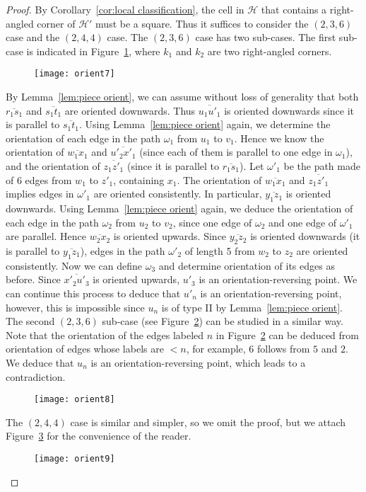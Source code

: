 \documentclass[11pt]{amsart}
\newcommand {\h}{\mathcal H}
\theoremstyle{definition}
\begin{document}
\begin{proof}
By Corollary~\ref{cor:local classification}, the cell in $\h$ that contains a right-angled corner of $\h'$ must be a square. Thus it suffices to consider the $(2,3,6)$ case and the $(2,4,4)$ case. The $(2,3,6)$ case has two sub-cases. The first sub-case is indicated in Figure~\ref{f:orient7}, where $k_1$ and $k_2$ are two right-angled corners.
\begin{figure}[h!]
	\centering
	\texttt{[image: orient7]}
	\caption{}
	\label{f:orient7}
\end{figure}
By Lemma~\ref{lem:piece orient}, we can assume without loss of generality that both $\overline{r_1s_1}$ and $\overline{s_1t_1}$ are oriented downwards. Thus $\overline{u_1u'_1}$ is oriented downwards since it is parallel to $\overline{s_1t_1}$. Using Lemma~\ref{lem:piece orient} again, we determine the orientation of each edge in the path $\omega_1$ from $u_1$ to $v_1$. Hence we know the orientation of $\overline{w_1x_1}$ and $\overline{u'_2x'_1}$ (since each of them is parallel to one edge in $\omega_1$), and the orientation of $\overline{z_1z'_1}$ (since it is parallel to $\overline{r_1s_1}$). Let $\omega'_1$ be the path made of 6 edges from $w_1$ to $z'_1$, containing $x_1$. The orientation of $\overline{w_1x_1}$ and $\overline{z_1z'_1}$ implies edges in $\omega'_1$ are oriented consistently. In particular, $\overline{y_1z_1}$ is oriented downwards. Using Lemma~\ref{lem:piece orient} again, we deduce the orientation of each edge in the path $\omega_2$ from $u_2$ to $v_2$, since one edge of $\omega_2$ and one edge of $\omega'_1$ are parallel. Hence $\overline{w_2x_2}$ is oriented upwards. Since $\overline{y_2z_2}$ is oriented downwards (it is parallel to $\overline{y_1z_1}$), edges in the path $\omega'_2$ of length 5 from $w_2$ to $z_2$ are oriented consistently. Now we can define $\omega_3$ and determine orientation of its edges as before. Since $\overline{x'_2u'_3}$ is oriented upwards, $u'_3$ is an orientation-reversing point. We can continue this process to deduce that $u'_{n}$ is an orientation-reversing point, however, this is impossible since $u_n$ is of type II by Lemma~\ref{lem:piece orient}. The second $(2,3,6)$ sub-case (see Figure~\ref{f:orient8}) can be studied in a similar way. Note that the orientation of the edges labeled $n$ in Figure~\ref{f:orient8} can be deduced from orientation of edges whose labels are $<n$, for example, $6$ follows from $5$ and $2$. We deduce that $u_n$ is an orientation-reversing point, which leads to a contradiction.
\begin{figure}[h!]
	\centering
	\texttt{[image: orient8]}
	\caption{}
	\label{f:orient8}
\end{figure}

The $(2,4,4)$ case is similar and simpler, so we omit the proof, but we attach Figure~\ref{f:orient9} for the convenience of the reader.
\begin{figure}[h!]
	\centering
	\texttt{[image: orient9]}
	\caption{}
	\label{f:orient9}
\end{figure}
\end{proof}
\end{document}
